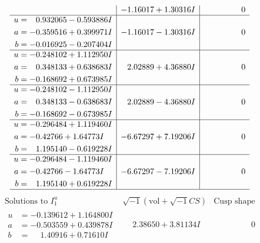 \documentclass[1p]{elsarticle_modified}
\theoremstyle{definition}
\newcommand{\I}{\sqrt{-1}}
\begin{document}
$$\begin{array}{c|c|c}
 & -1.16017 + 1.30316 I & \phantom{-0.000000 } 0 \\ \hline\begin{aligned}
u &= \phantom{-}0.932065 - 0.593886 I \\
a &= -0.359516 + 0.399971 I \\
b &= -0.016925 - 0.207404 I\end{aligned}
 & -1.16017 - 1.30316 I & \phantom{-0.000000 } 0 \\ \hline\begin{aligned}
u &= -0.248102 + 1.112950 I \\
a &= \phantom{-}0.348133 + 0.638683 I \\
b &= -0.168692 + 0.673985 I\end{aligned}
 & \phantom{-}2.02889 + 4.36880 I & \phantom{-0.000000 } 0 \\ \hline\begin{aligned}
u &= -0.248102 - 1.112950 I \\
a &= \phantom{-}0.348133 - 0.638683 I \\
b &= -0.168692 - 0.673985 I\end{aligned}
 & \phantom{-}2.02889 - 4.36880 I & \phantom{-0.000000 } 0 \\ \hline\begin{aligned}
u &= -0.296484 + 1.119460 I \\
a &= -0.42766 + 1.64773 I \\
b &= \phantom{-}1.195140 - 0.619228 I\end{aligned}
 & -6.67297 + 7.19206 I & \phantom{-0.000000 } 0 \\ \hline\begin{aligned}
u &= -0.296484 - 1.119460 I \\
a &= -0.42766 - 1.64773 I \\
b &= \phantom{-}1.195140 + 0.619228 I\end{aligned}
 & -6.67297 - 7.19206 I & \phantom{-0.000000 } 0\\
 \hline 
 \end{array}$$\newpage$$\begin{array}{c|c|c}  
\text{Solutions to }I^u_{1}& \I (\text{vol} + \sqrt{-1}CS) & \text{Cusp shape}\\
 \hline 
\begin{aligned}
u &= -0.139612 + 1.164800 I \\
a &= -0.503559 + 0.439878 I \\
b &= \phantom{-}1.40916 + 0.71610 I\end{aligned}
 & \phantom{-}2.38650 + 3.81134 I & \phantom{-0.000000 } 0 \\ \hline\begin{aligned}

\end{aligned}
\end{array}$$
\end{document}
